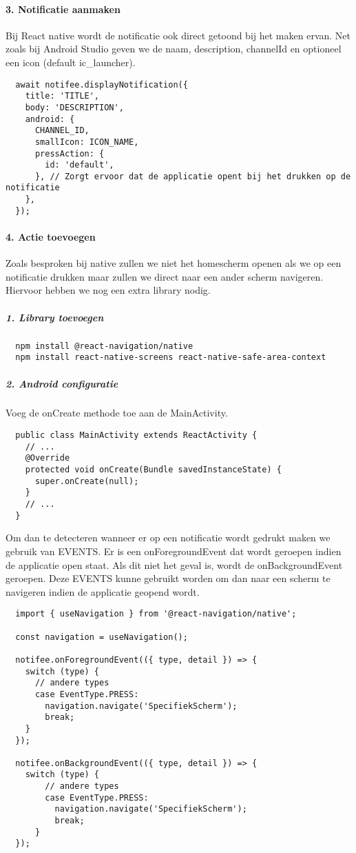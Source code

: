 \paragraph{3. Notificatie aanmaken}
Bij React native wordt de notificatie ook direct getoond bij het maken ervan. Net zoals bij Android Studio 
geven we de naam, description, channelId en optioneel een icon (default ic_launcher).
\begin{verbatim}
  await notifee.displayNotification({
    title: 'TITLE',
    body: 'DESCRIPTION',
    android: {
      CHANNEL_ID,
      smallIcon: ICON_NAME,
      pressAction: {
        id: 'default',
      }, // Zorgt ervoor dat de applicatie opent bij het drukken op de notificatie
    },
  });
\end{verbatim}

\paragraph{4. Actie toevoegen}
Zoals besproken bij native zullen we niet het homescherm openen als we op een notificatie drukken maar zullen we 
direct naar een ander scherm navigeren. Hiervoor hebben we nog een extra library nodig. 
\subparagraph{1. Library toevoegen}
\begin{verbatim}
  npm install @react-navigation/native
  npm install react-native-screens react-native-safe-area-context
\end{verbatim}

\subparagraph{2. Android configuratie} %
Voeg de onCreate methode toe aan de MainActivity.
\begin{verbatim}
  public class MainActivity extends ReactActivity {
    // ...
    @Override
    protected void onCreate(Bundle savedInstanceState) {
      super.onCreate(null);
    }
    // ...
  }
\end{verbatim}
Om dan te detecteren wanneer er op een notificatie wordt gedrukt maken we gebruik van EVENTS. Er is een onForegroundEvent 
dat wordt geroepen indien de applicatie open staat. Als dit niet het geval is, wordt de onBackgroundEvent 
geroepen. Deze EVENTS kunne gebruikt worden om dan naar een scherm te navigeren indien de applicatie geopend wordt.
\begin{verbatim}
  import { useNavigation } from '@react-navigation/native';

  const navigation = useNavigation();

  notifee.onForegroundEvent(({ type, detail }) => {
    switch (type) {
      // andere types
      case EventType.PRESS:
        navigation.navigate('SpecifiekScherm'); 
        break;
    }
  });
  
  notifee.onBackgroundEvent(({ type, detail }) => {
    switch (type) {
        // andere types
        case EventType.PRESS:
          navigation.navigate('SpecifiekScherm'); 
          break;
      }
  });
\end{verbatim}

